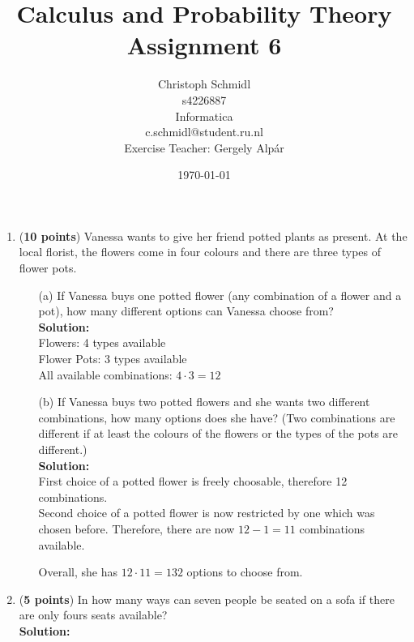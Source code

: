 \documentclass[a4paper]{article}
\title{Calculus and Probability Theory\\ Assignment 6}
\author{Christoph Schmidl\\
s4226887\\
Informatica\\
c.schmidl@student.ru.nl\\
Exercise Teacher: Gergely Alp\'{a}r}
\date{\today}
\begin{document}
\maketitle

\begin{enumerate}

\item (\textbf{10 points}) Vanessa wants to give her friend potted plants as present. At the local florist, the flowers come in four colours and there are three types of flower pots.


\begin{enumerate}
	\item[(a)] If Vanessa buys one potted flower (any combination of a flower and a pot), how many different options can Vanessa choose from?\\
	\textbf{Solution:}\\

Flowers: 4 types available\\
Flower Pots: 3 types available\\

All available combinations: $4 \cdot 3 = 12$\\
	
	
	
	\item[(b)] If Vanessa buys two potted flowers and she wants two different combinations, how many options does she have? (Two combinations are different if at least the colours of the flowers or the types of the pots are different.)\\
	\textbf{Solution:}\\

First choice of a potted flower is freely choosable, therefore 12 combinations.\\

Second choice of a potted flower is now restricted by one which was chosen before. Therefore, there are now $12 - 1 = 11$ combinations available.

Overall, she has $12 \cdot 11 = 132$ options to choose from.\\


	
	
\end{enumerate}


\item (\textbf{5 points}) In how many ways can seven people be seated on a sofa if there are only fours seats available?\\
\textbf{Solution:}\\
	

\end{enumerate}
\end{document}
